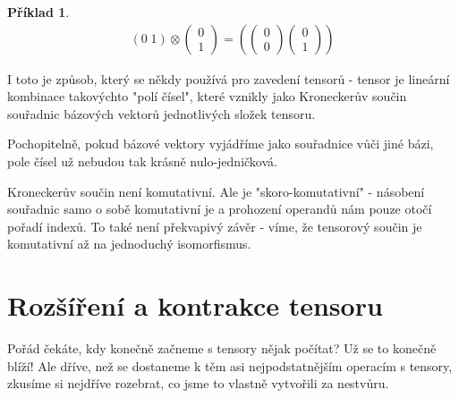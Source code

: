\documentclass[a5paper,12pt]{amsbook}
\theoremstyle{definition}
\newtheorem{example}{Příklad}[chapter]
\begin{document}
\begin{example}
\begin{equation*}
\begin{split}
\left(0 \; 1\right)\otimes\left(\begin{array}{c}0 \\ 1\end{array}\right)
=\left(
\left(\begin{array}{c}0 \\ 0\end{array}\right)
\left(\begin{array}{c}0 \\ 1\end{array}\right)
\right)
\end{split}
\end{equation*}

\end{example}

\noindent
I toto je způsob, který se někdy používá pro zavedení tensorů - tensor je lineární
kombinace takovýchto "polí čísel", které vznikly jako Kroneckerův součin souřadnic
bázových vektorů jednotlivých složek tensoru.

Pochopitelně, pokud bázové vektory vyjádříme jako souřadnice vůči jiné bázi, pole čísel
už nebudou tak krásně nulo-jedničková.

Kroneckerův součin není komutativní. Ale je "skoro-komutativní" - násobení souřadnic
samo o sobě komutativní je a prohození operandů nám pouze otočí pořadí indexů. To také
není překvapivý závěr - víme, že tensorový součin je komutativní až na jednoduchý
isomorfismus.

\section{Rozšíření a kontrakce tensoru}

\noindent
Pořád čekáte, kdy konečně začneme s tensory nějak počítat? Už se to konečně blíží!
Ale dříve, než se dostaneme k těm asi nejpodstatnějším operacím s tensory, zkusíme
si nejdříve rozebrat, co jsme to vlastně vytvořili za nestvůru.
\end{document}
